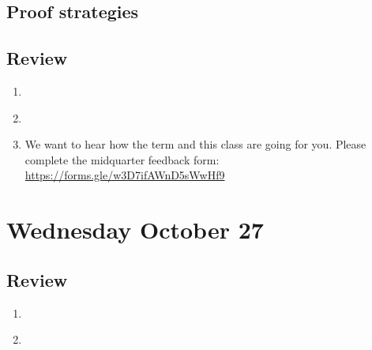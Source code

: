 \documentclass[12pt, oneside]{article}
\begin{document}
\subsection*{Proof strategies}




\newpage






\newpage

\vfill

\newpage
\subsection*{Review}
\begin{enumerate}
\item \hspace{1in}\\ 
\item \hspace{1in}\\ 
\item We want to hear how the term and this class are going for you.
Please complete the midquarter feedback form: \href{https://forms.gle/w3D7ifAWnD5sWwHf9}{https://forms.gle/w3D7ifAWnD5sWwHf9}
\end{enumerate}

\newpage
\section*{Wednesday October 27}

\newpage

\newpage
\subsection*{Review}
\begin{enumerate}
\item \hspace{1in}\\ 
\item \hspace{1in}\\ 
\end{enumerate}
\end{document}
